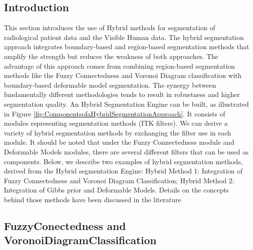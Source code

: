 %
%
% 
%
%
%

\subsection{Introduction}
\label{sec:HybridSegmentationIntroduction}


This section introduces the use of Hybrid methods for segmentation of
radiological patient data and the Visible Human data. The hybrid segmentation
approach integrates boundary-based and region-based segmentation methods that
amplify the strength but reduces the weakness of both approaches. The advantage
of this approach comes from combining region-based segmentation methods like
the Fuzzy Connectedness and Voronoi Diagram classification with boundary-based
deformable model segmentation. The synergy between fundamentally different
methodologies tends to result in robustness and higher segmentation quality. 
An Hybrid Segmentation Engine can be built, as illustrated in Figure
\ref{fig:ComponentsofaHybridSegmentationApproach}. It consists of modules
representing segmentation methods (ITK filters). We can derive a variety of
hybrid segmentation methods by exchanging the filter use in each module. It
should be noted that under the Fuzzy Connectedness module and Deformable Models
modules, there are several different filters that can be used as components.
Below, we describe two examples of hybrid segmentation methods,
derived from the Hybrid segmentation Engine: Hybrid Method 1: Integration of
Fuzzy Connectedness and Voronoi Diagram Classification; Hybrid Method 2:
Integration of Gibbs prior and Deformable Models.  Details on the concepts
behind those methods have been discussed in the literature
\cite{Angelini2002,Udupa2002,Jin2002,Imielinska2001,Imielinska2000a,Imielinska2000b}



\subsection{FuzzyConectedness and VoronoiDiagramClassification}
\label{sec:HybridMethod1}

